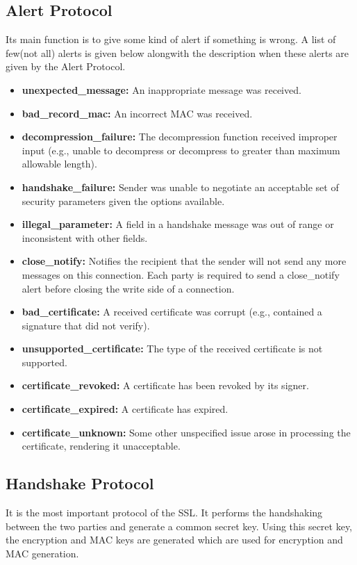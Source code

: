 \documentclass[11pt]{article}
\begin{document}
 \subsection{Alert Protocol}
 Its main function is to give some kind of alert if something is wrong. A list of few(not all) alerts is given below alongwith the description when these alerts are given by the Alert Protocol.
 \begin{itemize}
     \item  \textbf{unexpected\_message:} An inappropriate message was received.
     \item \textbf{bad\_record\_mac:} An incorrect MAC was received.
     \item \textbf{decompression\_failure:} The decompression function received improper input (e.g., unable to decompress or decompress to greater than maximum allowable length).
     \item \textbf{handshake\_failure:} Sender was unable to negotiate an acceptable set of security parameters given the options available.
     \item \textbf{illegal\_parameter:} A field in a handshake message was out of range or inconsistent with other fields.
     \item \textbf{close\_notify:} Notifies the recipient that the sender will not send any more messages on this connection. Each party is required to send a close\_notify alert before closing the write side of a connection.
    \item \textbf{bad\_certificate:} A received certificate was corrupt (e.g., contained a signature that did not verify).
    \item \textbf{unsupported\_certificate:} The type of the received certificate is not supported.
    \item \textbf{certificate\_revoked:} A certificate has been revoked by its signer.
    \item \textbf{certificate\_expired:} A certificate has expired.
    \item \textbf{certificate\_unknown:} Some other unspecified issue arose in processing the certificate, rendering it unacceptable.
 \end{itemize}
 
 \subsection{Handshake Protocol}
It is the most important protocol of the SSL. It performs the handshaking between the two parties and generate a common secret key. Using this secret key, the encryption and MAC keys are generated which are used for encryption and MAC generation.
\end{document}
